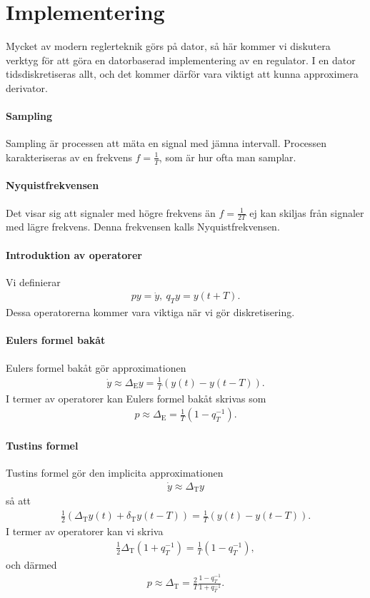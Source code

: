 \section{Implementering}
Mycket av modern reglerteknik görs på dator, så här kommer vi diskutera verktyg för att göra en datorbaserad implementering av en regulator. I en dator tidsdiskretiseras allt, och det kommer därför vara viktigt att kunna approximera derivator.

\paragraph{Sampling}
Sampling är processen att mäta en signal med jämna intervall. Processen karakteriseras av en frekvens $f = \frac{1}{T}$, som är hur ofta man samplar.

\paragraph{Nyquistfrekvensen}
Det visar sig att signaler med högre frekvens än $f = \frac{1}{2T}$ ej kan skiljas från signaler med lägre frekvens. Denna frekvensen kalls Nyquistfrekvensen.

\paragraph{Introduktion av operatorer}
Vi definierar
\begin{align*}
	py = \dot{y},\ q_{T}y = y(t + T).
\end{align*}
Dessa operatorerna kommer vara viktiga när vi gör diskretisering.

\paragraph{Eulers formel bakåt}
Eulers formel bakåt gör approximationen
\begin{align*}
	\dot{y} \approx \Delta_{\text{E}}y = \frac{1}{T}(y(t) - y(t - T)).
\end{align*}
I termer av operatorer kan Eulers formel bakåt skrivas som
\begin{align*}
	p \approx \Delta_{\text{E}} = \frac{1}{T}(1 - q_{T}^{-1}).
\end{align*}

\paragraph{Tustins formel}
Tustins formel gör den implicita approximationen
\begin{align*}
	\dot{y} \approx \Delta_{\text{T}}y
\end{align*}
så att
\begin{align*}
	\frac{1}{2}(\Delta_{\text{T}}y(t) + \delta_{\text{T}}y(t - T)) = \frac{1}{T}(y(t) - y(t - T)).
\end{align*}
I termer av operatorer kan vi skriva
\begin{align*}
	\frac{1}{2}\Delta_{\text{T}}(1 + q_{T}^{-1}) = \frac{1}{T}(1 - q_{T}^{-1}),
\end{align*}
och därmed
\begin{align*}
	p \approx \Delta_{\text{T}} = \frac{2}{T}\frac{1 - q_{T}^{-1}}{1 + q_{T}^{-1}}.
\end{align*}
